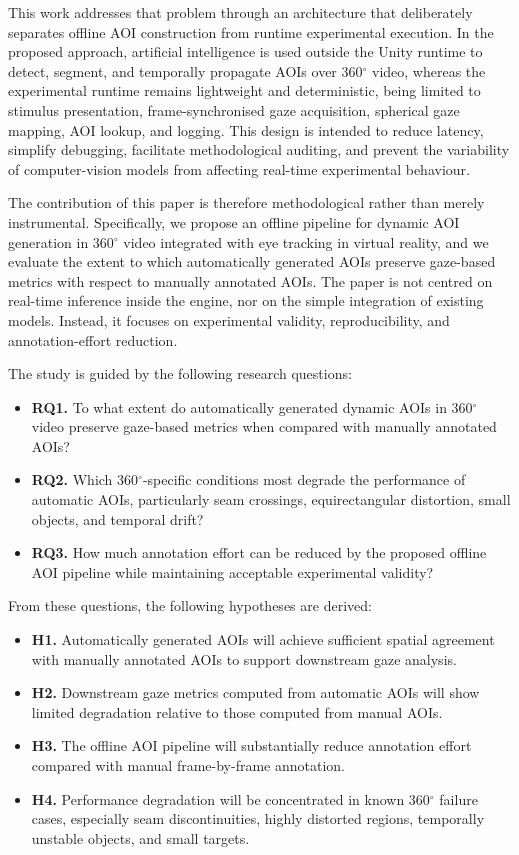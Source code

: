\documentclass[11pt]{article}
\begin{document}
This work addresses that problem through an architecture that deliberately separates offline AOI construction from runtime experimental execution. In the proposed approach, artificial intelligence is used outside the Unity runtime to detect, segment, and temporally propagate AOIs over 360$^{\circ}$ video, whereas the experimental runtime remains lightweight and deterministic, being limited to stimulus presentation, frame-synchronised gaze acquisition, spherical gaze mapping, AOI lookup, and logging. This design is intended to reduce latency, simplify debugging, facilitate methodological auditing, and prevent the variability of computer-vision models from affecting real-time experimental behaviour.

The contribution of this paper is therefore methodological rather than merely instrumental. Specifically, we propose an offline pipeline for dynamic AOI generation in 360$^{\circ}$ video integrated with eye tracking in virtual reality, and we evaluate the extent to which automatically generated AOIs preserve gaze-based metrics with respect to manually annotated AOIs. The paper is not centred on real-time inference inside the engine, nor on the simple integration of existing models. Instead, it focuses on experimental validity, reproducibility, and annotation-effort reduction.

The study is guided by the following research questions:

\begin{itemize}
    \item \textbf{RQ1.} To what extent do automatically generated dynamic AOIs in 360$^{\circ}$ video preserve gaze-based metrics when compared with manually annotated AOIs?
    \item \textbf{RQ2.} Which 360$^{\circ}$-specific conditions most degrade the performance of automatic AOIs, particularly seam crossings, equirectangular distortion, small objects, and temporal drift?
    \item \textbf{RQ3.} How much annotation effort can be reduced by the proposed offline AOI pipeline while maintaining acceptable experimental validity?
\end{itemize}

From these questions, the following hypotheses are derived:

\begin{itemize}
    \item \textbf{H1.} Automatically generated AOIs will achieve sufficient spatial agreement with manually annotated AOIs to support downstream gaze analysis.
    \item \textbf{H2.} Downstream gaze metrics computed from automatic AOIs will show limited degradation relative to those computed from manual AOIs.
    \item \textbf{H3.} The offline AOI pipeline will substantially reduce annotation effort compared with manual frame-by-frame annotation.
    \item \textbf{H4.} Performance degradation will be concentrated in known 360$^{\circ}$ failure cases, especially seam discontinuities, highly distorted regions, temporally unstable objects, and small targets.
\end{itemize}
\end{document}
